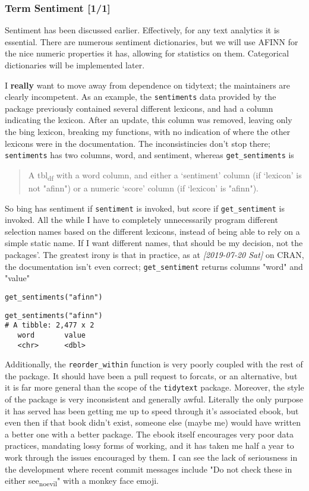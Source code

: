 \documentclass[a4paper, 11pt]{article}
\begin{document}
\subsubsection{Term Sentiment [1/1]}
\label{sec:org3be893a}
Sentiment has been discussed earlier. Effectively, for any text
analytics it is essential. There are numerous sentiment dictionaries,
but we will use AFINN for the nice numeric properties it has, allowing
for statistics on them. Categorical dictionaries will be implemented
later.

I \textbf{really} want to move away from dependence on tidytext; the
maintainers are clearly incompetent. As an example, the \texttt{sentiments}
data provided by the package previously contained several different
lexicons, and had a column indicating the lexicon. After an update,
this column was removed, leaving only the bing lexicon, breaking my
functions, with no indication of where the other lexicons were in the
documentation. The inconsistincies don't stop there; \texttt{sentiments} has
two columns, word, and sentiment, whereas \texttt{get\_sentiments} is
\begin{quote}
A tbl\textsubscript{df} with a word column, and either a ‘sentiment’ column (if
‘lexicon’ is not "afinn") or a numeric ‘score’ column (if
‘lexicon’ is "afinn").
\end{quote}
So bing has sentiment if \texttt{sentiment} is invoked, but score if
\texttt{get\_sentiment} is invoked. All the while I have to completely
unnecessarily program different selection names based on the different
lexicons, instead of being able to rely on a simple static name. If I
want different names, that should be my decision, not the packages'.
The greatest irony is that in practice, as at \textit{[2019-07-20 Sat] } on
CRAN, the documentation isn't even correct; \texttt{get\_sentiment} returns
columns "word" and "value"

\begin{verbatim}
get_sentiments("afinn")
\end{verbatim}

\begin{verbatim}
get_sentiments("afinn")
# A tibble: 2,477 x 2
   word       value
   <chr>      <dbl>
\end{verbatim}


 Additionally, the \texttt{reorder\_within} function is very
poorly coupled with the rest of the package. It should have been a
pull request to forcats, or an alternative, but it is far more general
than the scope of the \texttt{tidytext} package. Moreover, the style of the
package is very inconsistent and generally awful. Literally the only
purpose it has served has been getting me up to speed through it's
associated ebook, but even then if that book didn't exist, someone
else (maybe me) would have written a better one with a better package.
The ebook itself encourages very poor data practices, mandating lossy
forms of working, and it has taken me half a year to work through the
issues encouraged by them. I can see the lack of seriousness in the
development where recent commit messages include "Do not check these
in either see\textsubscript{no}\textsubscript{evil}" with a monkey face emoji. 
\end{document}
